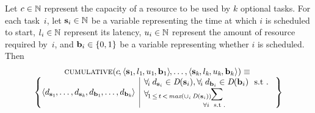 \begin{definition}
  Let \mbox{$c \in \mathbb{N}$} represent the capacity of a resource to be used
  by $k$ optional tasks.
  For each task~$i$, let \mbox{$\mVar{s}_i \in \mNatNumSet$} be a \gls{variable}
  representing the time at which $i$ is scheduled to start, \mbox{$l_i \in
    \mathbb{N}$} represent its latency, \mbox{$u_i \in \mathbb{N}$} represent
  the amount of resource required by~$i$, and \mbox{$\mVar{b}_i \in \mSet{0,
      1}$} be a \gls{variable} representing whether $i$ is scheduled.
  Then
  \begin{displaymath}
    \begin{array}{c}
      \mCumulative(
        c \hspace{-1pt},
        \mTuple{
          \mVar{s}_1 \hspace{-.8pt},
          l_1 \hspace{-.8pt},
          u_1 \hspace{-.8pt},
          \mVar{b}_1
        } \hspace{-1pt},
        \ldots,
        \mTuple{
          \mVar{s}_k \hspace{-.8pt},
          l_k \hspace{-.8pt},
          u_k \hspace{-.8pt},
          \mVar{b}_k
        }
      )
      \equiv \mbox{} \\
      \mSetBuilder*{%
                     \langle d_{\mVar{s}_1} \hspace{-.8pt}, \ldots, d_{\mVar{s}_k}
                             \hspace{-.8pt},
                             d_{\mVar{b}_1} \hspace{-.8pt}, \ldots, d_{\mVar{b}_k}
                             \hspace{-1pt}
                     \rangle
                   }%
                   {
                     \begin{array}{@{}l@{}}
                       \forall_{\! i} \: d_{\mVar{s}_i} \in \mDomain(\mVar{s}_i),
                       \forall_{\! i} \: d_{\mVar{b}_i} \in \mDomain(\mVar{b}_i)
                       \text{ \st} \\
                       \forall_{\! 1 \,\leq\, t \,<\, \mMax(\cup_i \mDomain(\mVar{s}_i))}
                         \displaystyle
                         \hspace{-1.2em}
                         \sum_{%
                                \substack{
                                  \forall{i} \text{ \st} \\
}}
\end{array}}
\end{array}
\end{displaymath}
\end{definition}
